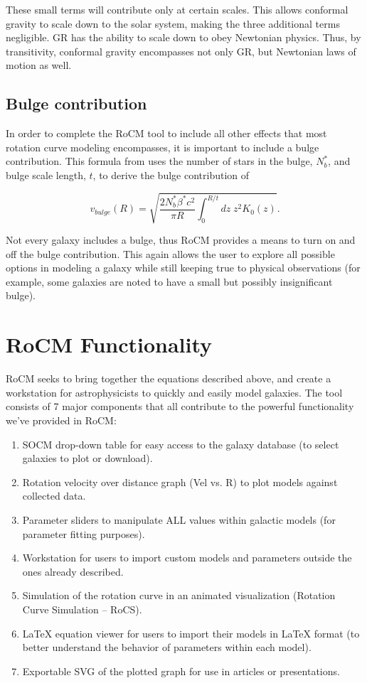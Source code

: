 \documentclass[conference]{IEEEtran-modified}
\begin{document}
These small terms will contribute only at certain scales. This allows conformal gravity to scale down to the solar system, making the three additional terms negligible. GR has the ability to scale down to obey Newtonian physics. Thus, by transitivity, conformal gravity encompasses not only GR, but Newtonian laws of motion as well.


\subsection{Bulge contribution}
In order to complete the RoCM tool to include all other effects that most rotation curve modeling encompasses, it is important to include a bulge contribution.  This formula from \cite{mannheim} uses the number of stars in the bulge, $N^*_b$, and bulge scale length, $t$, to derive the bulge contribution of

\begin{equation}
v_{bulge}(R) = \sqrt{\frac{2 N^*_b\beta^* c^2}{\pi R} \int_0^{R/t} dz\; z^2K_0(z)}.
\end{equation}

Not every galaxy includes a bulge, thus RoCM provides a means to turn on and off the bulge contribution.  This again allows the user to explore all possible options in modeling a galaxy while still keeping true to physical observations (for example, some galaxies are noted to have a small but possibly insignificant bulge).


\section{RoCM Functionality}\label{rocm_func}
RoCM seeks to bring together the equations described above, and create a workstation for astrophysicists to quickly and easily model galaxies. The tool consists of 7 major components that all contribute to the powerful functionality we've provided in RoCM:
\begin{enumerate}
       \item SOCM drop-down table for easy access to the galaxy database (to select galaxies to plot or download).
       \item Rotation velocity over distance graph (Vel vs. R) to plot models against collected data.
       \item Parameter sliders to manipulate ALL values within galactic models (for parameter fitting purposes).
       \item Workstation for users to import custom models and parameters outside the ones already described.
       \item Simulation of the rotation curve in an animated visualization (Rotation Curve Simulation -- RoCS).
       \item LaTeX equation viewer for users to import their models in LaTeX format (to better understand the behavior of parameters within each model).
       \item Exportable SVG of the plotted graph for use in articles or presentations.
\end{enumerate}
\end{document}
